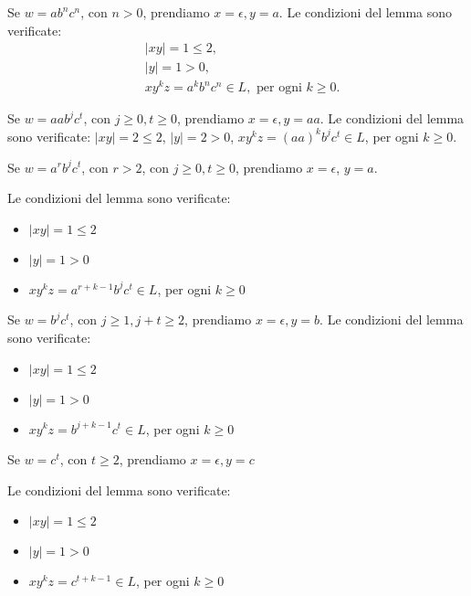 \vspace{5mm}

Se $w=a b^{n} c^{n}$, con $n>0$, prendiamo $x=\epsilon, y=a$. Le condizioni del lemma sono verificate:
$$
\begin{aligned}
&|x y|=1 \leq 2, \\
&|y|=1>0, \\
&x y^{k} z=a^{k} b^{n} c^{n} \in L, \text { per ogni } k \geq 0 .
\end{aligned}
$$

\vspace{5mm}

Se $w=a a b^{j} c^{t}$, con $j \geq 0, t \geq 0$, prendiamo $x=\epsilon, y=a a .$
Le condizioni del lemma sono verificate:
$|x y|=2 \leq 2$, $|y|=2>0$, $x y^{k} z=(a a)^{k} b^{j} c^{t} \in L$, per ogni $k \geq 0 .$

\vspace{5mm}

Se $w=a^{r} b^{j} c^{t}$, con $r>2$, con $j \geq 0, t \geq 0$, prendiamo $x=\epsilon$,
$y=a .$

Le condizioni del lemma sono verificate:
\begin{itemize}
    \item $|x y|=1 \leq 2$
    \item $|y|=1>0$
    \item $x y^{k} z=a^{r+k-1} b^{j} c^{t} \in L$, per ogni $k \geq 0$
\end{itemize}

Se $w=b^{j} c^{t}$, con $j \geq 1, j+t \geq 2$, prendiamo $x=\epsilon, y=b .$
Le condizioni del lemma sono verificate:
\begin{itemize}
    \item $|x y|=1 \leq 2$
    \item $|y|=1>0$
    \item $x y^{k} z=b^{j+k-1} c^{t} \in L$, per ogni $k \geq 0$
\end{itemize}

Se $w=c^{t}$, con $t \geq 2$, prendiamo $x=\epsilon, y=c$

Le condizioni del lemma sono verificate:
\begin{itemize}
    \item $|x y|=1 \leq 2$
    \item $|y|=1>0$
    \item $x y^{k} z=c^{t+k-1} \in L$, per ogni $k \geq 0$
\end{itemize}

\vspace{5mm}

